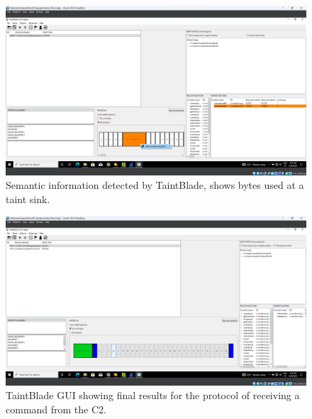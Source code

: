 \documentclass[conference]{IEEEtran}
\begin{document}
\begin{figure}[htbp]
    \centerline{\includegraphics[width=\textwidth]{images/sch_s9.png}}
    \caption{Semantic information detected by TaintBlade, shows bytes used at a taint sink.}
    \label{figure:ap_sch_s9}
\end{figure}

\begin{figure}[htbp]
    \centerline{\includegraphics[width=\textwidth]{images/sch_s10.png}}
    \caption{TaintBlade GUI showing final results for the protocol of receiving a command from the C2.}
    \label{figure:ap_sch_s10}
\end{figure}
\end{document}
